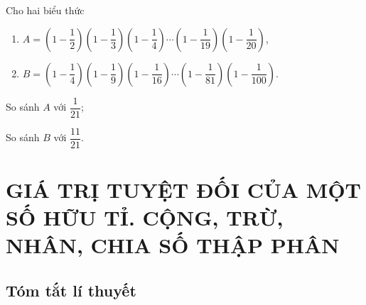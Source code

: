 \begin{bt}%
Cho hai biểu thức
\begin{enumerate}[ ]
\item $ A=\left(1-\dfrac{1}{2}\right)\left(1-\dfrac{1}{3}\right)\left(1-\dfrac{1}{4}\right)\cdots \left(1-\dfrac{1}{19}\right)\left(1-\dfrac{1}{20}\right) $,
\item $ B=\left(1-\dfrac{1}{4}\right)\left(1-\dfrac{1}{9}\right)\left(1-\dfrac{1}{16}\right)\cdots \left(1-\dfrac{1}{81}\right)\left(1-\dfrac{1}{100}\right) $.
\end{enumerate}
\begin{enumEX}{2}
\item So sánh $ A $ với $ \dfrac{1}{21} $;
\item So sánh $ B $ với $ \dfrac{11}{21} $.
\end{enumEX}
\end{bt}
\section{GIÁ TRỊ TUYỆT ĐỐI CỦA MỘT SỐ HỮU TỈ. CỘNG, TRỪ, NHÂN, CHIA SỐ THẬP PHÂN}
\subsection{Tóm tắt lí thuyết}
